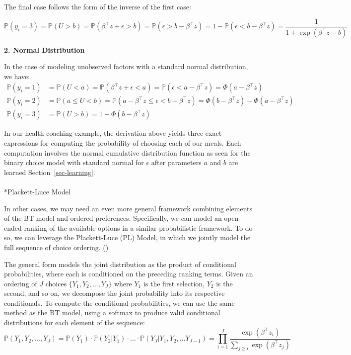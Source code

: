 \documentclass[
  letterpaper,
  numbers=noenddot,
  DIV=11,
  oneside]{scrreprt}
\makeatletter
\let\oldparagraph\paragraph
\renewcommand{\paragraph}{
    \@ifstar
      \xxxParagraphStar
      \xxxParagraphNoStar
  }
\newcommand{\xxxParagraphStar}[1]{\oldparagraph*{#1}\mbox{}}
\newcommand{\xxxParagraphNoStar}[1]{\oldparagraph{#1}\mbox{}}
\theoremstyle{remark}
\makeatother
\begin{document}
The final case follows the form of the inverse of the first case:

\[\mathbb{P}(y_i = 3) = \mathbb{P}(U > b) = \mathbb{P}(\beta^\top z + \epsilon > b ) = \mathbb{P}( \epsilon > b - \beta^\top z) = 1 - \mathbb{P}( \epsilon < b - \beta^\top z) = \frac{1}{1 + \exp(\beta^\top z - b)}\]

\textbf{2. Normal Distribution}

In the case of modeling unobserved factors with a standard normal
distribution, we have: \[\begin{split}
    \mathbb{P}(y_i = 1) & = \mathbb{P}(U < a) = \mathbb{P}(\beta^\top z + \epsilon < a ) = \mathbb{P}( \epsilon < a - \beta^\top z) = \Phi(a - \beta^\top z) \\
    \mathbb{P}(y_i = 2) & = \mathbb{P}(a \le U < b) 
    = \mathbb{P}(a - \beta^\top z \le \epsilon < b - \beta^\top z) = \Phi(b - \beta^\top z) - \Phi(a - \beta^\top z) \\
    \mathbb{P}(y_i = 3) & = \mathbb{P}(U > b) 
    = 1 - \Phi(b - \beta^\top z) 
\end{split}\]

In our health coaching example, the derivation above yields three exact
expressions for computing the probability of choosing each of our meals.
Each computation involves the normal cumulative distribution function as
seen for the binary choice model with standard normal for \(\epsilon\)
after parameters \(a\) and \(b\) are learned Section~\ref{sec-learning}.

\paragraph*{Plackett-Luce Model}\label{plackett-luce-model}

In other cases, we may need an even more general framework combining
elements of the BT model and ordered preferences. Specifically, we can
model an open-ended ranking of the available options in a similar
probabilistic framework. To do so, we can leverage the Plackett-Luce
(PL) Model, in which we jointly model the full sequence of choice
ordering. ()

The general form models the joint distribution as the product of
conditional probabilities, where each is conditioned on the preceding
ranking terms. Given an ordering of \(J\) choices
\(\{Y_1, Y_2, \dots, Y_J\}\) where \(Y_1\) is the first selection,
\(Y_2\) is the second, and so on, we decompose the joint probability
into its respective conditionals. To compute the conditional
probabilities, we can use the same method as the BT model, using a
softmax to produce valid conditional distributions for each element of
the sequence:
\[\mathbb{P}(Y_1, Y_2, \dots, Y_J) = \mathbb{P}(Y_1) \cdot \mathbb{P}(Y_2 | Y_1) \cdot \dots \cdot \mathbb{P}(Y_J | Y_1, Y_2, \dots Y_{J - 1}) = \prod_{i = 1}^J \frac{\exp(\beta^\top z_i)}{\sum_{j \ge i} \exp(\beta^\top z_j)}\]
\end{document}
